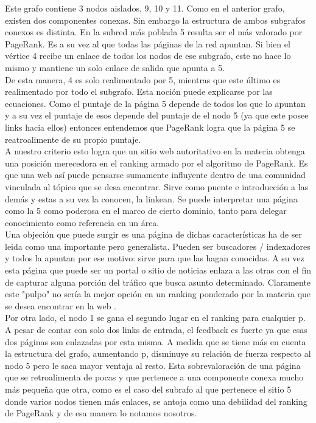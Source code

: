 \begin{center}
\begin{tabular}{|c|c|c||c|c|c|}
                \end{tabular}
            \end{center}
            
Este grafo contiene 3 nodos aislados, 9, 10 y 11. Como en el anterior grafo, existen dos componentes conexas. Sin embargo la estructura de ambos subgrafos conexos es distinta. En la subred más poblada 5 resulta ser el más valorado por PageRank. Es a su vez al que todas las páginas de la red apuntan. Si bien el vértice 4 recibe un enlace de todos los nodos de ese subgrafo, este no hace lo mismo y mantiene un solo enlace de salida que apunta a 5. \\

De esta manera, 4 es solo realimentado por 5, mientras que este último es realimentado por todo el subgrafo. Esta noción puede explicarse por las ecuaciones. Como el puntaje de la página 5 depende de todos los que lo apuntan y a su vez el puntaje de esos depende del puntaje de el nodo 5 (ya que este posee links hacia ellos) entonces entendemos que PageRank logra que la página 5 se reatroalimente de su propio puntaje. \\

A nuestro criterio esto logra que un sitio web autoritativo en la materia obtenga una posición merecedora en el ranking armado por el algoritmo de PageRank. Es que una web así puede pensarse sumamente influyente dentro de una comunidad vinculada al tópico que se desa encontrar. Sirve como puente e introducción a las demás y estas a su vez la conocen, la linkean. Se puede interpretar una página como la 5 como poderosa en el marco de cierto dominio, tanto para delegar conocimiento como referencia en un área. \\

Una objeción que puede surgir es una página de dichas características ha de ser leida como una importante pero generalista. Pueden ser buscadores / indexadores y todos la apuntan por ese motivo: sirve para que las hagan conocidas. A su vez esta página que puede ser un portal o sitio de noticias enlaza a las otras con el fin de capturar alguna porción del tráfico que busca asunto determinado. Claramente este "pulpo" no sería la mejor opción en un ranking ponderado por la materia que se desea encontrar en la web .\\

Por otra lado, el nodo 1 se gana el segundo lugar en el ranking para cualquier p. A pesar de contar con solo dos links de entrada, el feedback es fuerte ya que esas dos páginas son enlazadas por esta misma. A medida que se tiene más en cuenta la estructura del grafo, aumentando p, disminuye su relación de fuerza respecto al nodo 5 pero le saca mayor ventaja al resto.
Esta sobrevaloración de una página que se retroalimenta de pocas y que pertenece a una componente conexa mucho más pequeña que otra, como es el caso del subrafo al que pertenece el sitio 5 donde varios nodos tienen más enlaces, se antoja como una debilidad del ranking de PageRank y de esa manera lo notamos nosotros. \\

